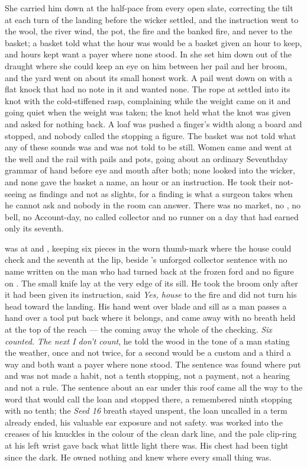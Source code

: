She carried him down  at the half-pace from every open slate, correcting the tilt at each turn of the landing before the wicker settled, and the instruction went to the wool, the river wind, the pot, the fire and the banked fire, and never to the basket; a basket told what the hour was would be a basket given an hour to keep, and hours kept want a payer where none stood. In  she set him down out of the draught where she could keep an eye on him between her pail and her broom, and the yard went on about its small honest work. A pail went down on  with a flat knock that had no note in it and wanted none. The rope at  settled into its knot with the cold-stiffened rasp, complaining while the weight came on it and going quiet when the weight was taken; the knot held what the knot was given and asked for nothing back. A loaf was pushed a finger's width along a board and stopped, and nobody called the stopping a figure. The basket was not told what any of these sounds was and was not told to be still. Women came and went at the well and the rail with pails and pots, going about an ordinary Seventhday grammar of hand before eye and mouth after both; none looked into the wicker, and none gave the basket a name, an hour or an instruction. He took their not-seeing as findings and not as slights, for a finding is what a surgeon takes when he cannot ask and nobody in the room can answer. There was no market, no , no bell, no Account-day, no called collector and no runner on a day that had earned only its seventh.

 was at  and , keeping six pieces in the worn thumb-mark where the house could check and the seventh at the lip, beside 's unforged collector sentence with no name written on the man who had turned back at the frozen ford and no figure on . The small knife lay at the very edge of its sill. He took the broom only after it had been given its instruction, said \emph{Yes, house} to the fire and did not turn his head toward the landing. His hand went over blade and sill as a man passes a hand over a tool put back where it belongs, and came away with no breath held at the top of the reach --- the coming away the whole of the checking. \emph{Six counted. The next I don't count}, he told the wood in the tone of a man stating the weather, once and not twice, for a second would be a custom and a third a way and both want a payer where none stood. The sentence was found where put and was not made a habit, not a tenth stopping, not a payment, not a hearing and not a rule. The sentence about an ear under this roof came all the way to the word that would call the loan and stopped there, a remembered ninth stopping with no tenth; the \emph{Seed 16} breath stayed unspent, the loan uncalled in a term already ended, his valuable ear exposure and not safety.  was worked into the creases of his knuckles in the colour of the clean dark line, and the pale clip-ring at his left wrist gave back what little light there was. His chest had been tight since the dark. He owned nothing and knew where every small thing was.

